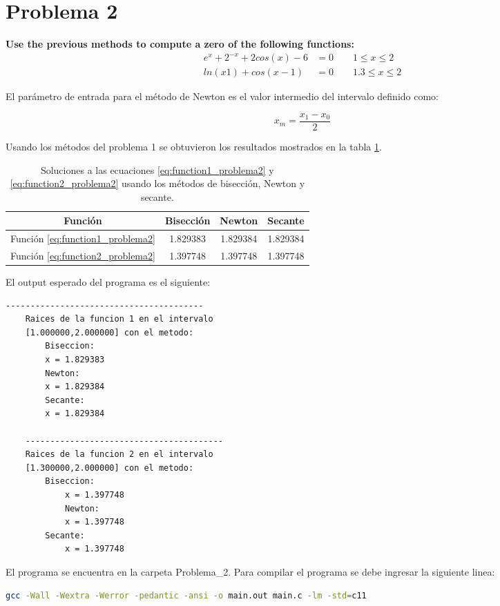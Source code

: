 \section*{Problema 2}
\textbf{Use the previous methods to compute a zero of the following functions:}
\begin{align}
    e^x+2^{-x} + 2cos(x) - 6 & =0  \qquad 1\leq   x \leq 2  \label{eq:function1_problema2} \\
    ln(x1)+cos(x-1)          & =0  \qquad 1.3\leq x \leq 2 \label{eq:function2_problema2}
\end{align}

El parámetro de entrada para el método de Newton es el valor intermedio del intervalo definido como:

\begin{equation*}
    x_{m}= \frac{x_1-x_0}{2}
\end{equation*}

Usando los métodos del problema 1 se obtuvieron los resultados mostrados en la tabla \ref{table:solutions_problema2}.

\begin{table}[H]
    \centering
    \begin{tabular}{cccc} \hline
        \textbf{Función}                     & \textbf{Bisección} & \textbf{Newton} & \textbf{Secante} \\ \hline
        Función \ref{eq:function1_problema2} & 1.829383           & 1.829384        & 1.829384         \\
        Función \ref{eq:function2_problema2} & 1.397748           & 1.397748        & 1.397748         \\ \hline
    \end{tabular}
    \caption{Soluciones a las ecuaciones \ref{eq:function1_problema2} y \ref{eq:function2_problema2} usando los métodos de bisección, Newton y secante.}
    \label{table:solutions_problema2}
\end{table}


El output esperado del programa es el siguiente:
\begin{lstlisting}[language=bash]
    ----------------------------------------
    Raices de la funcion 1 en el intervalo
    [1.000000,2.000000] con el metodo:
        Biseccion:
        x = 1.829383
        Newton:
        x = 1.829384
        Secante:
        x = 1.829384
    
    ----------------------------------------
    Raices de la funcion 2 en el intervalo
    [1.300000,2.000000] con el metodo:
        Biseccion:
            x = 1.397748
            Newton:
            x = 1.397748
        Secante:
            x = 1.397748
\end{lstlisting}
El programa se encuentra en la carpeta \textcolor{citecolor}{Problema\_2}. Para compilar el programa se debe ingresar la siguiente linea:

\begin{lstlisting}[language=bash]
    gcc -Wall -Wextra -Werror -pedantic -ansi -o main.out main.c -lm -std=c11  
\end{lstlisting}
